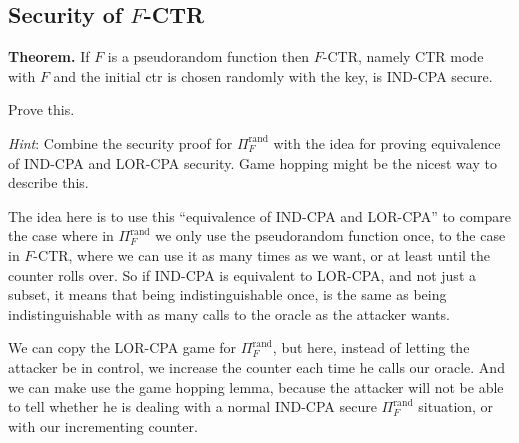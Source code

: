 \documentclass{article}
\begin{document}
  \subsection{Security of $F$-CTR}
  \begin{centerframebox}
    \textbf{Theorem.} If $F$ is a pseudorandom function then $F$-CTR, namely CTR
    mode with $F$ and the initial ctr is chosen randomly with the key, is IND-CPA secure.

    Prove this.

    \textit{Hint}: Combine the security proof for $\Pi^\textrm{rand}_F$
    with the idea for proving equivalence of IND-CPA and LOR-CPA\footnotemark{} security.
    Game hopping might be the nicest way to describe this.
  \end{centerframebox}
  \label{sec:ctr}
  The idea here is to use this ``equivalence of IND-CPA and LOR-CPA''
  to compare the case where in $\Pi^\textrm{rand}_F$ we only use the pseudorandom function once,
  to the case in $F$-CTR, where we can use it as many times as we want, or at least until the counter rolls over.
  So if IND-CPA is equivalent to LOR-CPA, and not just a subset, it means that being indistinguishable once,
  is the same as being indistinguishable with as many calls to the oracle as the attacker wants.

  We can copy the LOR-CPA game for $\Pi^\textrm{rand}_F$, but here, instead of letting the attacker be in control,
  we increase the counter each time he calls our oracle.
  And we can make use the game hopping lemma,
  because the attacker will not be able to tell whether he is dealing with a normal IND-CPA secure $\Pi^\textrm{rand}_F$ situation,
  or with our incrementing counter.
\end{document}
